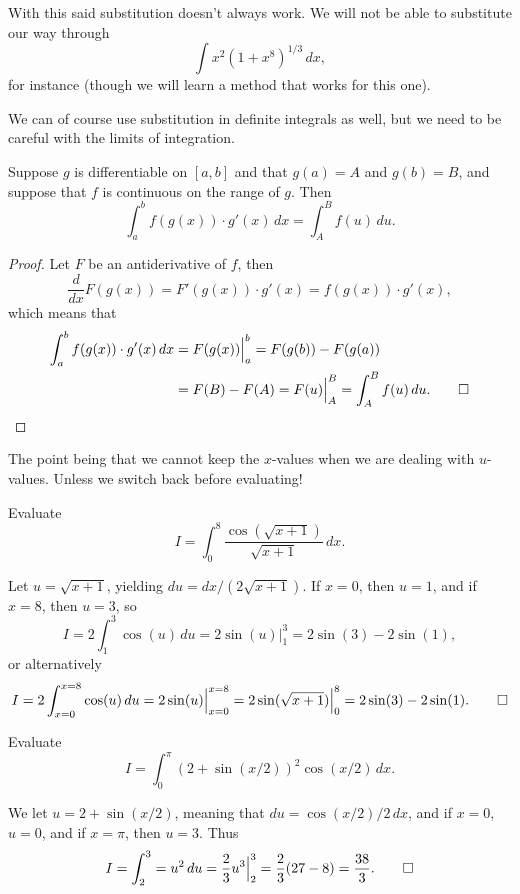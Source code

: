 \noindent
With this said substitution doesn't always work.
We will not be able to substitute our way through
\[
	\int x^2 (1 + x^8)^{1/3} \, d x,
\]
for instance (though we will learn a method that works for this one).

We can of course use substitution in definite integrals as well, but we need to be careful with the limits of integration.

\begin{theorem}
	Suppose $g$ is differentiable on $[a, b]$ and that $g(a) = A$ and $g(b) = B$, and suppose that $f$ is continuous on the range of $g$.
	Then
	\[
		\int_a^b f(g(x)) \cdot g'(x) \, d x = \int_A^B f(u) \, d u.
	\]
\end{theorem}

\begin{proof}
	Let $F$ be an antiderivative of $f$, then
	\[
		\frac{d}{d x} F(g(x)) = F'(g(x)) \cdot g'(x) = f(g(x)) \cdot g'(x),
	\]
	which means that
	\begin{align*}
		\int_a^b f(g(x)) \cdot g'(x) \, d x & = F(g(x)) \Big \rvert_a^b = F(g(b)) - F(g(a))                         \\
		                                    & = F(B) - F(A) = F(u) \Big \rvert_A^B = \int_A^B f(u) \, d u. \qedhere
	\end{align*}
\end{proof}

\noindent
The point being that we cannot keep the $x$-values when we are dealing with $u$-values.
Unless we switch back before evaluating!

\begin{example}
	Evaluate
	\[
		I = \int_0^8 \frac{\cos(\sqrt{x + 1})}{\sqrt{x + 1}} \, d x.
	\]

	\noindent
	Let $u = \sqrt{x + 1}$, yielding $d u = d x / (2 \sqrt{x + 1})$.
	If $x = 0$, then $u = 1$, and if $x = 8$, then $u = 3$, so
	\[
		I = 2 \int_1^3 \cos(u) \, d u = 2 \sin(u) \Big \rvert_1^3 = 2 \sin(3) - 2 \sin(1),
	\]
	or alternatively
	\[
		I = 2 \int_{x = 0}^{x = 8} \cos(u) \, d u = 2 \sin(u) \Big \rvert_{x = 0}^{x = 8} = 2 \sin(\sqrt{x + 1}) \Big \rvert_0^8 = 2 \sin(3) - 2 \sin(1). \qedhere
	\]
\end{example}

\begin{example}
	Evaluate
	\[
		I = \int_0^\pi (2 + \sin(x / 2))^2 \cos(x / 2) \, d x.
	\]

	\noindent
	We let $u = 2 + \sin(x / 2)$, meaning that $d u = \cos(x / 2) / 2 \, d x$, and if $x = 0$, $u = 0$, and if $x = \pi$, then $u = 3$.
	Thus
	\[
		I = \int_2^3 = u^2 \, d u = \frac{2}{3} u^3 \Big \rvert_2^3 = \frac{2}{3} (27 - 8) = \frac{38}{3}. \qedhere
	\]
\end{example}

